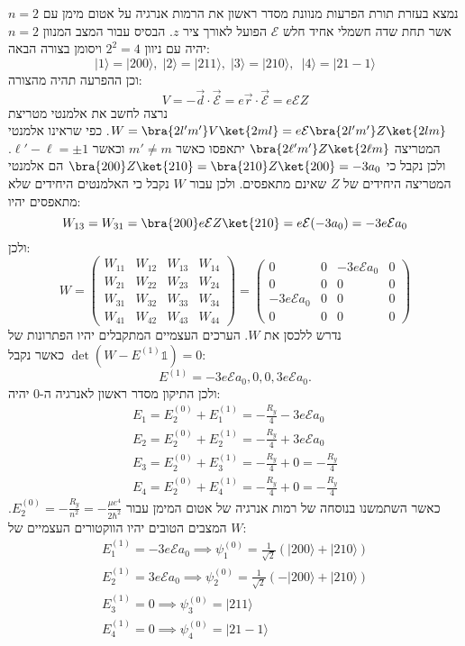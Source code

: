 \documentclass{tstextbook}
\begin{document}
\begin{example}
נמצא בעזרת תורת הפרעות מנוונת מסדר ראשון את הרמות אנרגיה על אטום מימן עם \(n=2\) אשר תחת שדה חשמלי אחיד חלש \(\mathcal{E}\) הפועל לאורך ציר \(z\). הבסיס עבור המצב המנוון \(n=2\) יהיה עם ניוון \(2^{2}=4\) ויסומן בצורה הבאה:
$$|1\rangle=|200\rangle,\;|2\rangle=|211\rangle,\;|3\rangle=|210\rangle,\;\ |4\rangle=|21-1\rangle$$
וכן ההפרעה תהיה מהצורה:
$$V=-\vec{d}\cdot\vec{\mathcal{E}}=e\vec{r}\cdot\vec{\mathcal{E}}=e\mathcal{E}Z$$
נרצה לחשב את אלמנטי מטריצת \(W=\bra{2l'm'}V\ket{2ml}=e\mathcal{E}\bra{2l'm'}Z\ket{2lm}\). כפי שראינו אלמנטי המטריצה \(\bra{2\ell'm'}Z\ket{2\ell m}\) יתאפסו כאשר \(m'\neq m\) וכאשר \(\ell'-\ell = \pm 1\). ולכן נקבל כי \(\bra{200}Z\ket{210} = \bra{210}Z\ket{200} = -3 a_0\) הם אלמנטי המטריצה היחידים של \(Z\) שאינם מתאפסים. ולכן עבור \(W\) נקבל כי האלמנטים היחידים שלא מתאפסים יהיו:
$$W_{13}=W_{31}=\bra{200}e\mathcal{E}Z\ket{210}=e\mathcal{E} (-3a_{0})=-3e\mathcal{E} a_{0}$$
ולכן:
$$W=\begin{pmatrix}W_{11}&W_{12}&W_{13}&W_{14}\\ W_{21}&W_{22}&W_{23}&W_{24}\\ W_{31}&W_{32}&W_{33}&W_{34}\\ W_{41}&W_{42}&W_{43}&W_{44}\end{pmatrix}=\begin{pmatrix}0&0&-3e\mathcal{E}a_{0}&0\\ 0&0&0&0\\ -3e\mathcal{E}a_{0}&0&0&0\\ 0&0&0&0\end{pmatrix}$$
נדרש ללכסן את \(W\). הערכים העצמיים המתקבלים יהיו הפתרונות של \(\det \left( W-E^{(1)}\mathbb{1} \right)=0\) כאשר נקבל:
$$E^{(1)}=-3e\mathcal{E}a_{0},0,0,3e\mathcal{E}a_{0}.$$
ולכן התיקון מסדר ראשון לאנרגיה ה-0 יהיה:
\begin{gather*}E_{1}=E_{2}^{(0)}+E_{1}^{(1)}=-\frac{R_{y}}{4}-3e{\mathcal{E}}a_{0}\\ E_{2}=E_{2}^{(0)}+E_{2}^{(1)}=-\frac{R_{y}}{4}+3e{\mathcal E}a_{0}\\ E_{3}=E_{2}^{(0)}+E_{3}^{(1)}=-\frac{R_{y}}{4}+0=-\frac{R_{y}}{4}\\ E_{4}=E_{2}^{(0)}+E_{4}^{(1)}=-\frac{R_{y}}{4}+0=-\frac{R_{y}}{4}
\end{gather*}
כאשר השתמשנו בנוסחה של רמות אנרגיה של אטום המימן עבור \(E_{2}^{(0)}=-\frac{R_{y}}{n^{2}}=-\frac{\mu e^{4}}{2\hbar^{2}}\). המצבים הטובים יהיו הווקטורים העצמיים של \(W\):
\begin{gather*}E_{1}^{(1)}=-3e{\mathcal{E}}a_{0}\implies\psi_{1}^{(0)}={\frac{1}{\sqrt{2}}}\left( |200\rangle+|210\rangle \right)\\ E_{2}^{(1)}=3e{\mathcal E}a_{0}\implies\psi_{2}^{(0)}={\frac{1}{\sqrt2}}\left( -|200\rangle+|210\rangle \right)\\ E_{3}^{(1)}=0\implies\psi_{3}^{(0)}=|211\rangle\\ E_{4}^{(1)}=0\implies\psi_{4}^{(0)}=|21-1\rangle
\end{gather*}

\end{example}
\end{document}
